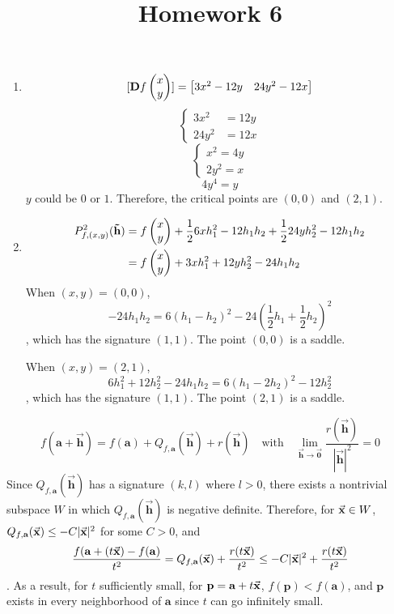 \documentclass{homework}
\title{Homework 6}
\begin{document}
\maketitle

\begin{problem}{1}
\begin{enumerate}
\item
$$[\mathbf{D}f\begin{pmatrix}x\\y\end{pmatrix}] = \begin{bmatrix}3x^2-12y & 24y^2-12x\end{bmatrix}$$
$$\left\{
\begin{aligned}
3x^2  &= 12y \\
24y^2 &= 12x
\end{aligned}
\right.$$
$$\left\{
\begin{aligned}
x^2  = 4y \\
2y^2 = x
\end{aligned}
\right.$$
$$4y^4 = y$$
$y$ could be $0$ or $1$. Therefore, the critical points are $(0, 0)$ and
$(2, 1)$.

\item
\begin{align*}
P_{f, (x,y)}^2 (\mathbf{\vec{h}})
&= f\begin{pmatrix}x\\y\end{pmatrix} + \frac{1}{2}6xh_1^2 - 12h_1h_2
  + \frac{1}{2}24yh_2^2 - 12h_1h_2\\
&= f\begin{pmatrix}x\\y\end{pmatrix} + 3xh_1^2 + 12yh_2^2 - 24h_1h_2\\
\end{align*}
When $(x, y) = (0, 0)$,
$$-24h_1h_2 = 6(h_1 - h_2)^2 - 24(\frac{1}{2}h_1 + \frac{1}{2}h_2)^2$$
, which has the signature $(1, 1)$. The point $(0, 0)$ is a saddle.

When $(x, y) = (2, 1)$,
$$6h_1^2 + 12h_2^2 - 24h_1h_2 = 6(h_1-2h_2)^2 - 12h_2^2$$
, which has the signature $(1, 1)$. The point $(2, 1)$ is a saddle.

\end{enumerate}
\end{problem}

\begin{problem}{2}
$$f(\mathbf{a}+\vec{\mathbf{h}}) = f(\mathbf{a}) +
Q_{f,\mathbf{a}}(\vec{\mathbf{h}}) + r(\vec{\mathbf{h}})
\quad \text{with} \quad \lim_{\vec{\mathbf{h}} \to \vec{\mathbf{0}}}
\frac{r(\vec{\mathbf{h}})}{|\vec{\mathbf{h}}|^2} = 0$$
Since $Q_{f,\mathbf{a}}(\vec{\mathbf{h}})$ has a signature $(k, l)$ where
$l > 0$, there exists a nontrivial subspace $W$ in which
$Q_{f,\mathbf{a}}(\vec{\mathbf{h}})$ is negative definite. Therefore, for
$\vec{\mathbf{x}} \in W$, $Q_{f,\mathbf{a}}(\vec{\mathbf{x}}) \leq -C|\vec{\mathbf{x}}|^2$ for some
$C > 0$, and
$$\frac{f(\mathbf{a} + (t\vec{\mathbf{x}}) - f(\mathbf{a})}{t^2}
= Q_{f,\mathbf{a}}(\vec{\mathbf{x}}) + \frac{r(t\vec{\mathbf{x}})}{t^2}
\leq -C|\vec{\mathbf{x}}|^2 + \frac{r(t\vec{\mathbf{x}})}{t^2}$$
. As a result, for $t$ sufficiently small, for
$\mathbf{p} = \mathbf{a} + t\vec{\mathbf{x}}$, $f(\mathbf{p}) < f(\mathbf{a})$, and
$\mathbf{p}$ exists in every neighborhood of $\mathbf{a}$ since $t$ can go
infinitely small. \QED
\end{problem}
\end{document}
